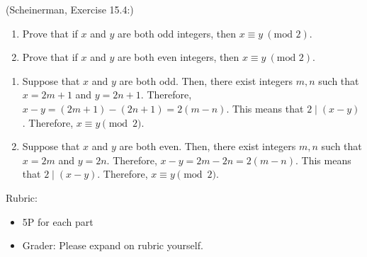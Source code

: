 \documentclass{article}
\newcommand{\modulo}{\text{mod }}
\theoremstyle{definition}
\begin{document}
\begin{question}
    (Scheinerman, Exercise 15.4:)
    \begin{enumerate}
        \item Prove that if $x$ and $y$ are both odd integers, then $x \equiv y \ (\modulo 2)$.
        \item Prove that if $x$ and $y$ are both even integers, then $x \equiv y \ (\modulo 2)$.
    \end{enumerate}
\end{question}
\begin{solution}
    \begin{enumerate}
    \item Suppose that $x$ and $y$ are both odd.  Then, there exist integers $m, n$ such that $x = 2m + 1$ and $y = 2n +1$.  Therefore, $x-y = (2m + 1) - (2n+1) = 2(m-n)$.  This means that $2\mid(x-y)$.  Therefore, $x \equiv y \pmod{2}$.
    \item Suppose that $x$ and $y$ are both even.  Then, there exist integers $m, n$ such that $x = 2m$ and $y = 2n$.  Therefore, $x-y = 2m - 2n = 2(m-n)$.  This means that $2\mid(x-y)$.  Therefore, $x \equiv y \pmod{2}$.
    \end{enumerate}
{\color{red} Rubric:
\begin{itemize}
\item 5P for each part
\item Grader: Please expand on rubric yourself.
\end{itemize}}
\end{solution}
\end{document}
